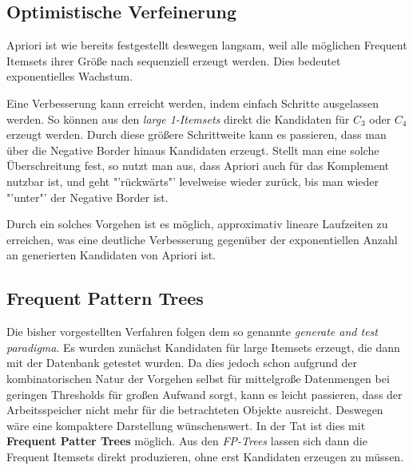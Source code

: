\subsection{Optimistische Verfeinerung}
Apriori ist wie bereits festgestellt deswegen langsam, weil alle möglichen Frequent
Itemsets ihrer Größe nach sequenziell erzeugt werden. Dies bedeutet exponentielles
Wachstum.

Eine Verbesserung kann erreicht werden, indem einfach Schritte ausgelassen werden.
So können aus den \textit{large 1-Itemsets} direkt die Kandidaten für \(C_3\) oder
\(C_4\) erzeugt werden. Durch diese größere Schrittweite kann es passieren, dass man
über die Negative Border hinaus Kandidaten erzeugt. Stellt man eine solche Überschreitung
fest, so nutzt man aus, dass Apriori auch für das Komplement nutzbar ist, und geht
"'rückwärts"' levelweise wieder zurück, bis man wieder "'unter"' der Negative Border ist.

Durch ein solches Vorgehen ist es möglich, approximativ lineare Laufzeiten zu erreichen, 
was eine deutliche Verbesserung gegenüber der exponentiellen Anzahl an generierten Kandidaten
von Apriori ist.

\subsection{Frequent Pattern Trees}
Die bisher vorgestellten Verfahren folgen dem so genannte \textit{generate and test
paradigma}. Es wurden zunächst Kandidaten für large Itemsets erzeugt, die dann 
mit der Datenbank getestet wurden. Da dies jedoch schon aufgrund der kombinatorischen
Natur der Vorgehen selbst für mittelgroße Datenmengen bei geringen Thresholds für
großen Aufwand sorgt, kann es leicht passieren, dass der Arbeitsspeicher nicht
mehr für die betrachteten Objekte ausreicht. Deswegen wäre eine kompaktere Darstellung
wünschenswert. In der Tat ist dies mit \textbf{Frequent Patter Trees} möglich.
Aus den \textit{FP-Trees} lassen sich dann die Frequent Itemsets direkt produzieren,
ohne erst Kandidaten erzeugen zu müssen.

